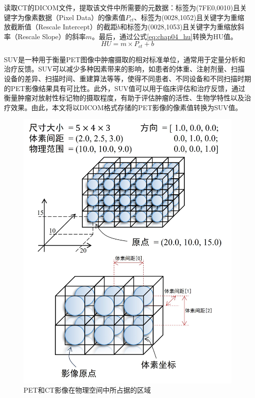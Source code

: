 读取CT的DICOM文件，提取该文件中所需要的元数据：标签为(7FE0,0010)且关键字为像素数据（Pixel Data）的像素值\(P_{ct}\)、标签为(0028,1052)且关键字为重缩放截断值（Rescale Intercept）的截距\(b\)和标签为(0028,1053)且关键字为重缩放斜率（Rescale Slope）的斜率\(m\)。最后，通过公式\ref{eq:chap04_hu}转换为HU值。
\begin{equation}
    HU = m \times P_{ct} + b
    \label{eq:chap04_hu}
\end{equation}

SUV是一种用于衡量PET图像中肿瘤摄取的相对标准单位，通常用于定量分析和治疗反馈。SUV可以减少多种因素带来的影响，如患者的体重、注射剂量、扫描设备的差异、扫描时间、重建算法等等，使得不同患者、不同设备和不同扫描时期的PET影像结果具有可比性。此外，SUV值可以用于临床评估和治疗反馈，通过衡量肿瘤对放射性标记物的摄取程度，有助于评估肿瘤的活性、生物学特性以及治疗效果。由此，本文将以DICOM格式存储的PET影像的像素值转换为SUV值。

\begin{figure}[b]
    \centering
    \includegraphics{figures/chap04_image.jpg}
    \caption{PET和CT影像在物理空间中所占据的区域}
    \label{fig:chap04_image}
\end{figure}

